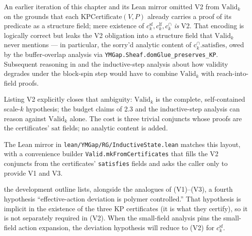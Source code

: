 \begin{remark}
\label{rem:V2-self-contained}
An earlier iteration of this chapter and its Lean mirror omitted V2 from $\mathrm{Valid}_k$ on the grounds that each $\mathrm{KPCertificate}(V, P)$ already carries a proof of its predicate as a structure field; mere existence of $c^{\mathrm{sf}}_k, c^{\mathrm{lf}}_k, c^{\cap}_k$ \emph{is} V2.  That encoding is logically correct but leaks the V2 obligation into a structure field that $\mathrm{Valid}_k$ never mentions --- in particular, the sorry'd analytic content of $\mathrm{c}^{\cap}_k.\mathrm{satisfies}$, owed by the buffer-overlap analysis via \texttt{YMGap.Sheaf.domGlue\_preserves\_KP}.  Subsequent reasoning in  and the inductive-step analysis about how validity degrades under the block-spin step would have to combine $\mathrm{Valid}_k$ with reach-into-field proofs.

Listing V2 explicitly closes that ambiguity: $\mathrm{Valid}_k$ is the complete, self-contained scale-$k$ hypothesis; the budget claims of 2.3 and the inductive-step analysis can reason against $\mathrm{Valid}_k$ alone.  The cost is three trivial conjuncts whose proofs are the certificates' $\mathrm{sat}$ fields; no analytic content is added.

The Lean mirror in \texttt{lean/YMGap/RG/InductiveState.lean} matches this layout, with a convenience builder \texttt{Valid.mkFromCertificates} that fills the V2 conjuncts from the certificates' \texttt{satisfies} fields and asks the caller only to provide V1 and V3.
\end{remark}

\begin{remark}
\label{rem:hypothesis-4}
the development outline lists, alongside the analogues of (V1)--(V3), a fourth hypothesis ``effective-action deviation is polymer controlled.''  That hypothesis is implicit in the existence of the three KP certificates (it is what they certify), so it is not separately required in (V2).  When the small-field analysis pins the small-field action expansion, the deviation hypothesis will reduce to (V2) for $c^{\mathrm{sf}}_k$.
\end{remark}

